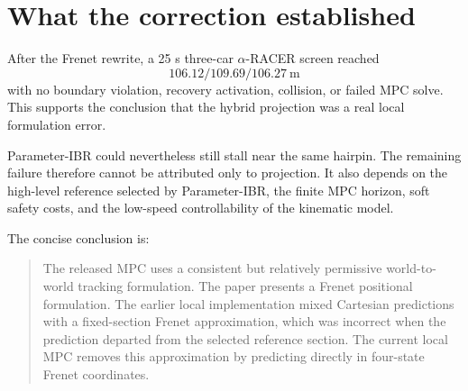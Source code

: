 \documentclass[11pt]{article}
\begin{document}
\section{What the correction established}

After the Frenet rewrite, a 25 s three-car $\alpha$-RACER screen reached
\[
  106.12/109.69/106.27\ \mathrm{m}
\]
with no boundary violation, recovery activation, collision, or failed MPC
solve. This supports the conclusion that the hybrid projection was a real local
formulation error.

Parameter-IBR could nevertheless still stall near the same hairpin. The
remaining failure therefore cannot be attributed only to projection. It also
depends on the high-level reference selected by Parameter-IBR, the finite MPC
horizon, soft safety costs, and the low-speed controllability of the kinematic
model.

The concise conclusion is:

\begin{quote}
The released MPC uses a consistent but relatively permissive world-to-world
tracking formulation. The paper presents a Frenet positional formulation. The
earlier local implementation mixed Cartesian predictions with a fixed-section
Frenet approximation, which was incorrect when the prediction departed from
the selected reference section. The current local MPC removes this
approximation by predicting directly in four-state Frenet coordinates.
\end{quote}
\end{document}
